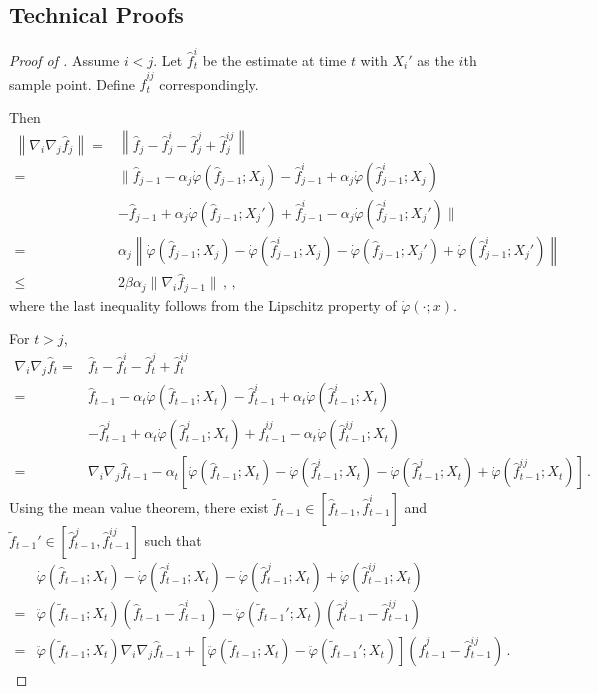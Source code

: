 \documentclass[11pt]{article}
\theoremstyle{plain}
\begin{document}
\subsection{Technical Proofs}\label{subsec:6.5-proof}
\begin{proof}[Proof of ]
     Assume $i<j$. Let $\hat f_t^{i}$ be the estimate at time $t$ with $X_i'$ as the $i$th sample point. Define $\hat f_t^{ij}$ correspondingly.

     Then
\begin{align}
\left\|\nabla_i\nabla_j\hat f_{j}\right\|= & \left\|\hat f_{j} - \hat f^i_{j} - \hat f^j_{j}+\hat f^{ij}_{j}\right\|\nonumber\\
=&\big\|\hat f_{j-1}-\alpha_{j}\dot\varphi(\hat f_{j-1};X_j) -
\hat f^i_{j-1}+\alpha_{j}\dot\varphi(\hat f^i_{j-1};X_j) \nonumber\\
&-\hat f_{j-1}+\alpha_{j}\dot\varphi(\hat f_{j-1};X_j') +
\hat f^i_{j-1}-\alpha_{j}\dot\varphi(\hat f^i_{j-1};X_j')\big\| \nonumber\\
=&\alpha_{j}\left\|\dot\varphi(\hat f_{j-1};X_j)-\dot\varphi(\hat f^i_{j-1};X_j)-\dot\varphi(\hat f_{j-1};X_j')+\dot\varphi(\hat f^i_{j-1};X_j')\right\|\nonumber\\
\le & 2\beta\alpha_{j}  \|\nabla_i\hat f_{j-1}\|\,,\label{eq:6.2-eta_j}\,,
\end{align}
where the last inequality follows from the Lipschitz property of $\dot\varphi(\cdot;x)$.

For $t>j$,
\begin{align}
  \nabla_i\nabla_j\hat f_{t}= & \hat f_{t} - \hat f^i_{t} - \hat f^j_{t}+\hat f^{ij}_{t}\nonumber\\
=&\hat f_{t-1}-\alpha_{t}\dot\varphi(\hat f_{t-1};X_t) -
\hat f^i_{t-1}+\alpha_{t}\dot\varphi(\hat f^i_{t-1};X_t) \nonumber\\
&-\hat f^j_{t-1}+\alpha_{t}\dot\varphi(\hat f^j_{t-1};X_t) +
\hat f^{ij}_{t-1}-\alpha_{t}\dot\varphi(\hat f^{ij}_{t-1};X_t) \nonumber\\
=&\nabla_i\nabla_j \hat f_{t-1} - \alpha_t\left[\dot\varphi(\hat f_{t-1};X_t)-\dot\varphi(\hat f_{t-1}^i;X_t)-\dot\varphi(\hat f_{t-1}^j;X_t)+\dot\varphi(\hat f_{t-1}^{ij};X_t)\right]\,.\label{eq:6.2-nabla2-f-eq1}
\end{align}
Using the mean value theorem, there exist $\tilde f_{t-1}\in[\hat f_{t-1},\hat f_{t-1}^i]$ and $\tilde f_{t-1}'\in[\hat f_{t-1}^j,\hat f_{t-1}^{ij}]$ such that
\begin{align*}
&  \dot\varphi(\hat f_{t-1};X_t)-\dot\varphi(\hat f_{t-1}^i;X_t)-\dot\varphi(\hat f_{t-1}^j;X_t)+\dot\varphi(\hat f_{t-1}^{ij};X_t)\\
=& \ddot\varphi(\tilde  f_{t-1};X_t)(\hat f_{t-1}-\hat f_{t-1}^i)-\ddot\varphi(\tilde f_{t-1}';X_t)(\hat f_{t-1}^j-\hat f_{t-1}^{ij})\\
=&\ddot\varphi(\tilde  f_{t-1};X_t) \nabla_i\nabla_j\hat f_{t-1}+\left[\ddot\varphi(\tilde f_{t-1};X_t)-\ddot\varphi(\tilde f_{t-1}';X_t)\right](\hat f_{t-1}^j-\hat f_{t-1}^{ij})\,.
\end{align*}


\end{proof}
\end{document}
